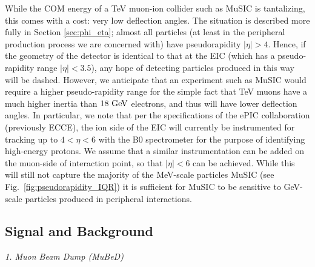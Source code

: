 While the COM energy of a TeV muon-ion collider such as MuSIC is tantalizing, this comes with a cost: very low deflection angles. The situation is described more fully in  Section \ref{sec:phi_eta}; almost all particles (at least in the peripheral production process we are concerned with) have pseudorapidity $|\eta| > 4$. Hence, if the geometry of the detector is identical to that at the EIC (which has a pseudo-rapidity range $|\eta| < 3.5$), any hope of detecting particles produced in this way will be dashed. However, we anticipate that an experiment such as MuSIC would require a higher pseudo-rapidity range for the simple fact that TeV muons have a much higher inertia than $18~{\rm GeV}$ electrons, and thus will have lower deflection angles. In particular, we note that per the specifications of the ePIC collaboration (previously ECCE), the ion side of the EIC will currently be instrumented for tracking up to $4 < \eta < 6$ with the B0 spectrometer \cite{Adkins:2022jfp} for the purpose of identifying high-energy protons. We assume that a similar instrumentation can be added on the muon-side of interaction point, so that $|\eta| < 6$ can be achieved. While this will still not capture the majority of the MeV-scale particles MuSIC (see Fig.~\ref{fig:pseudorapidity_IQR}) it is sufficient for MuSIC to be sensitive to GeV-scale particles produced in peripheral interactions.


\subsection{Signal and Background}\label{MuSIC_MuBeD_ALP_BG}


\begin{center}
    {\it 1. Muon Beam Dump (MuBeD)}
\end{center}

